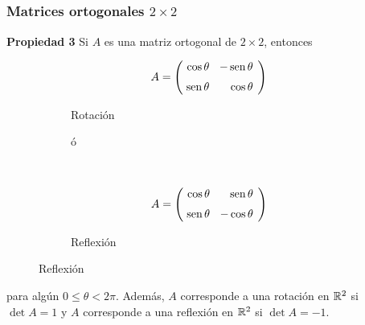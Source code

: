 
\subsection{} 

\begin{frame}\frametitle{Matrices ortogonales $2\times 2$}
	
	\begin{prop}{\textbf{Propiedad 3}}\justifying 
		Si $A$ es una matriz ortogonal de $2\times 2$, entonces 
		\begin{figure}
			\centering
			\begin{subfigure}[b]{0.4\textwidth}
				\[
				A=
				\left(
				\begin{array}{@{\hspace{0.5\tabcolsep}}r@{\hspace{1.5\tabcolsep}}r@{\hspace{0.7\tabcolsep}}}
				\cos\theta & -\sen\theta   \\[2mm]
				\sen\theta & \cos\theta  
				\end{array}
				\right)		
				\]
				\caption{Rotación}
			\end{subfigure}
			\hspace{3mm}
			\begin{subfigure}[b]{0.1\textwidth}
				ó
				\vspace{1.15cm}
			\end{subfigure}
			\hspace{-6mm}
			~ %
			\begin{subfigure}[b]{0.4\textwidth}
				\[
				A=
				\left(
				\begin{array}{@{\hspace{0.5\tabcolsep}}r@{\hspace{1.5\tabcolsep}}r@{\hspace{0.7\tabcolsep}}}
				\cos\theta & \sen\theta   \\[2mm]
				\sen\theta & -\cos\theta  
				\end{array}
				\right)		
				\]
				\caption{Reflexión}
			\end{subfigure}
		\end{figure}
	
		\vspace{2mm}
		para algún $0\leq \theta <2\pi$. Además, $A$ corresponde a una rotación en $\mathbb{R}^2$ si $\det A=1$ y $A$ corresponde 
		a una reflexión en $\mathbb{R}^2$ si $\det A=-1$.
		
	\end{prop}
	
\end{frame}


